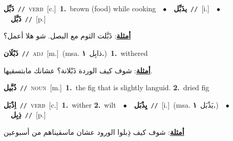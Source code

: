 \documentclass[10pt,a4paper,twoside]{article} %
\begin{document}
\begin{multicols}{2}
{\setlength\topsep{0pt}\textbf{\foreignlanguage{arabic}{ذَبِّل}}\ {\color{gray}\texttt{//}\color{black}}\ \textsc{verb}\ [c.]\ \textbf{1.}~brown (food) while cooking\ \ $\bullet$\ \ \setlength\topsep{0pt}\textbf{\foreignlanguage{arabic}{يذَبِّل}}\ {\color{gray}\texttt{//}\color{black}}\ [i.]\ \ $\bullet$\ \ \setlength\topsep{0pt}\textbf{\foreignlanguage{arabic}{ذَبَّل}}\ {\color{gray}\texttt{//}\color{black}}\ [p.]\  \begin{flushright}\color{gray}\foreignlanguage{arabic}{\textbf{\underline{\foreignlanguage{arabic}{أمثلة}}}: ذَبَّلت الثوم مع البصل. شو هلا أعمل؟}\end{flushright}\color{black}} \vspace{2mm}

{\setlength\topsep{0pt}\textbf{\foreignlanguage{arabic}{ذَبْلَان}}\ {\color{gray}\texttt{//}\color{black}}\ \textsc{adj}\ [m.]\ \color{gray}(msa. \foreignlanguage{arabic}{ذابِل}~\foreignlanguage{arabic}{\textbf{١.}})\color{black}\ \textbf{1.}~withered\  \begin{flushright}\color{gray}\foreignlanguage{arabic}{\textbf{\underline{\foreignlanguage{arabic}{أمثلة}}}: شوف كيف الوردة ذَبْلانة؟ عشانك مابتسقيها.}\end{flushright}\color{black}} \vspace{2mm}

{\setlength\topsep{0pt}\textbf{\foreignlanguage{arabic}{ذُبَّيل}}\ {\color{gray}\texttt{//}\color{black}}\ \textsc{noun}\ [m.]\ \textbf{1.}~the fig that is slightly languid.  \textbf{2.}~dried fig\ 

{\setlength\topsep{0pt}\textbf{\foreignlanguage{arabic}{اِذْبَل}}\ {\color{gray}\texttt{//}\color{black}}\ \textsc{verb}\ [c.]\ \textbf{1.}~wither  \textbf{2.}~wilt\ \ $\bullet$\ \ \setlength\topsep{0pt}\textbf{\foreignlanguage{arabic}{يِذْبَل}}\ {\color{gray}\texttt{//}\color{black}}\ [i.]\ \color{gray}(msa. \foreignlanguage{arabic}{يَذْبَل}~\foreignlanguage{arabic}{\textbf{١.}})\color{black}\ \ $\bullet$\ \ \setlength\topsep{0pt}\textbf{\foreignlanguage{arabic}{ذِبِل}}\ {\color{gray}\texttt{//}\color{black}}\ [p.]\  \begin{flushright}\color{gray}\foreignlanguage{arabic}{\textbf{\underline{\foreignlanguage{arabic}{أمثلة}}}: شوف كيف ذِبلوا الورود عشان ماسقيناهم من أسبوعين}\end{flushright}\color{black}} \vspace{2mm}

}
\end{multicols}
\end{document}
